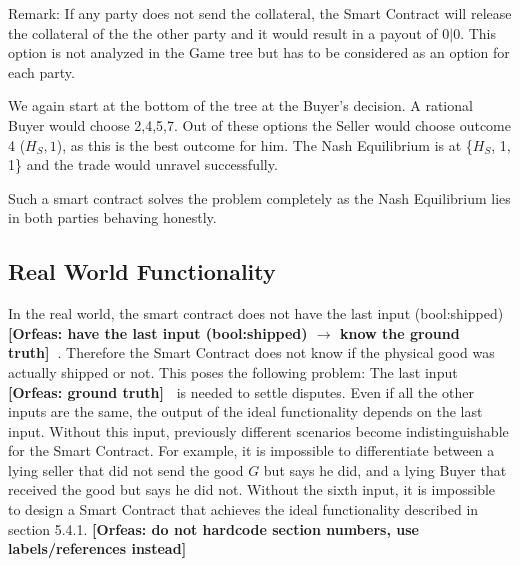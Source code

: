 \documentclass{cacthesis}
\newcommand{\authnote}[3]{{ \footnotesize \textbf{#1[#2: #3]~}}}
\newcommand{\orfnote}[1]{\authnote{\color{blue}}{Orfeas}{#1}}
\begin{document}
Remark: If any party does not send the collateral, the Smart Contract will release the collateral of the the other party and it would result in a payout of $0|0$. This option is not analyzed in the Game tree but has to be considered as an option for each party.\newline

We again start at the bottom of the tree at the Buyer's decision. A rational Buyer would choose 2,4,5,7. Out of these options the Seller would choose outcome 4 ($H_S,1$), as this is the best outcome for him.\newline
The Nash Equilibrium is at \{$H_S$, 1, 1\} and the trade would unravel successfully.\newline

Such a smart contract solves the problem completely as the Nash Equilibrium lies in both parties behaving honestly.
\subsection{Real World Functionality}
In the real world, the smart contract does not have the last input
(bool:shipped) \orfnote{have the last input (bool:shipped) $\rightarrow$ know
the ground truth}. Therefore the Smart Contract does not know if the physical good was actually shipped or not. \newline
This poses the following problem: The last input \orfnote{ground truth} is needed to settle disputes. Even if all the other inputs are the same, the output of the ideal functionality depends on the last input. Without this input, previously different scenarios become indistinguishable for the Smart Contract.\newline
For example, it is impossible to differentiate between a lying seller that did not send the good $G$ but says he did, and a lying Buyer that received the good but says he did not.\newline 
Without the sixth input, it is impossible to design a Smart Contract that achieves the ideal functionality described in section 5.4.1.
\orfnote{do not hardcode section numbers, use labels/references instead}
\end{document}
